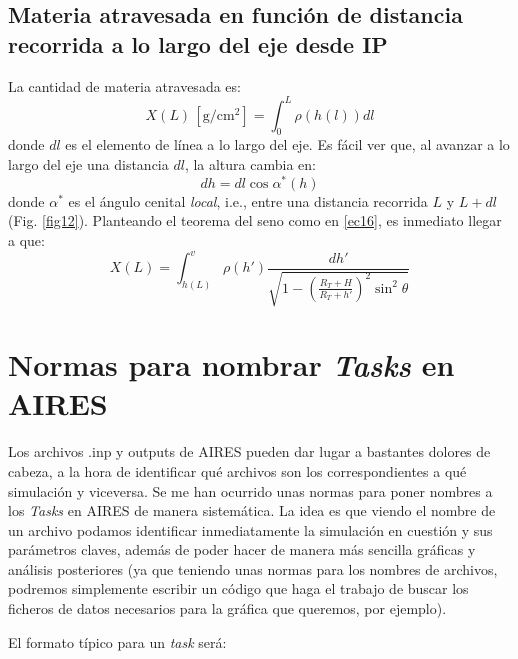 \documentclass[a4paper,12pt]{article}
\numberwithin{equation}{section}
\numberwithin{figure}{section}
\begin{document}
\subsection{Materia atravesada en función de distancia recorrida a lo largo del eje desde IP}
La cantidad de materia atravesada es:
\begin{equation}
	X(L)\,\left[\mathrm{g/cm^2}\right]=\int_{0}^L\rho(h(l))dl\label{ec110}
\end{equation}
donde $dl$ es el elemento de línea a lo largo del eje. Es fácil ver que, al avanzar a lo largo del eje una distancia $dl$, la altura cambia en:
\begin{equation}
	dh = dl \cos{\alpha^*(h)}\label{ec111}
\end{equation}
donde $\alpha^*$ es el ángulo cenital \textit{local}, i.e., entre una distancia recorrida $L$ y $L+dl$ (Fig. \ref{fig12}). Planteando el teorema del seno como en \eqref{ec16}, es inmediato llegar a que:
\begin{equation}
	X(L) = \int_{h(L)}^{v}\rho(h')\frac{dh'}{\sqrt{1-\left(\frac{R_T+H}{R_T+h'}\right)^2\sin^2\theta}}\label{ec112}
\end{equation}

\section{Normas para nombrar \textit{Tasks} en AIRES}
Los archivos .inp y outputs de AIRES pueden dar lugar a bastantes dolores de cabeza, a la hora de identificar qué archivos son los correspondientes a qué simulación y viceversa. Se me han ocurrido unas normas para poner nombres a los \textit{Tasks} en AIRES de manera sistemática. La idea es que viendo el nombre de un archivo podamos identificar inmediatamente la simulación en cuestión y sus parámetros claves, además de poder hacer de manera más sencilla gráficas y análisis posteriores (ya que teniendo unas normas para los nombres de archivos, podremos simplemente escribir un código que haga el trabajo de buscar los ficheros de datos necesarios para la gráfica que queremos, por ejemplo).

El formato típico para un \textit{task} será:
\end{document}
